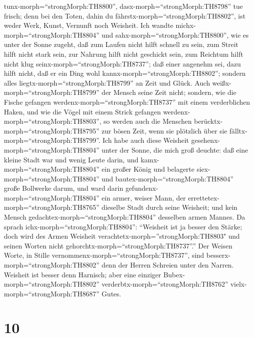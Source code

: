 tunx-morph=``strongMorph:TH8800'', dasx-morph=``strongMorph:TH8798'' tue
frisch; denn bei den Toten, dahin du
fährstx-morph=``strongMorph:TH8802'', ist weder Werk, Kunst, Vernunft
noch Weisheit.  Ich wandte
michx-morph=``strongMorph:TH8804'' und
sahx-morph=``strongMorph:TH8800'', wie es unter der Sonne zugeht, daß
zum Laufen nicht hilft schnell zu sein, zum Streit hilft nicht stark
sein, zur Nahrung hilft nicht geschickt sein, zum Reichtum hilft nicht
klug seinx-morph=``strongMorph:TH8737''; daß einer angenehm sei, dazu
hilft nicht, daß er ein Ding wohl kannx-morph=``strongMorph:TH8802'';
sondern alles liegtx-morph=``strongMorph:TH8799'' an Zeit und Glück.
 Auch weißx-morph=``strongMorph:TH8799'' der Mensch seine
Zeit nicht; sondern, wie die Fische gefangen
werdenx-morph=``strongMorph:TH8737'' mit einem verderblichen Haken, und
wie die Vögel mit einem Strick gefangen
werdenx-morph=``strongMorph:TH8803'', so werden auch die Menschen
berücktx-morph=``strongMorph:TH8795'' zur bösen Zeit, wenn sie plötzlich
über sie fälltx-morph=``strongMorph:TH8799''.  Ich habe
auch diese Weisheit gesehenx-morph=``strongMorph:TH8804'' unter der
Sonne, die mich groß deuchte:  daß eine kleine Stadt war
und wenig Leute darin, und kamx-morph=``strongMorph:TH8804'' ein großer
König und belagerte siex-morph=``strongMorph:TH8804'' und
bautex-morph=``strongMorph:TH8804'' große Bollwerke darum, 
und ward darin gefundenx-morph=``strongMorph:TH8804'' ein armer, weiser
Mann, der errettetex-morph=``strongMorph:TH8765'' dieselbe Stadt durch
seine Weisheit; und kein Mensch gedachtex-morph=``strongMorph:TH8804''
desselben armen Mannes.  Da sprach
ichx-morph=``strongMorph:TH8804'': ``Weisheit ist ja besser den Stärke;
doch wird des Armen Weisheit verachtetx-morph=''strongMorph:TH8803" und
seinen Worten nicht gehorchtx-morph=``strongMorph:TH8737''.''
 Der Weisen Worte, in Stille
vernommenx-morph=``strongMorph:TH8737'', sind
besserx-morph=``strongMorph:TH8802'' denn der Herren Schreien unter den
Narren.  Weisheit ist besser denn Harnisch; aber eine
einziger Bubex-morph=``strongMorph:TH8802''
verderbtx-morph=``strongMorph:TH8762''
vielx-morph=``strongMorph:TH8687'' Gutes.

\hypertarget{section-9}{%
\section{10}\label{section-9}}

